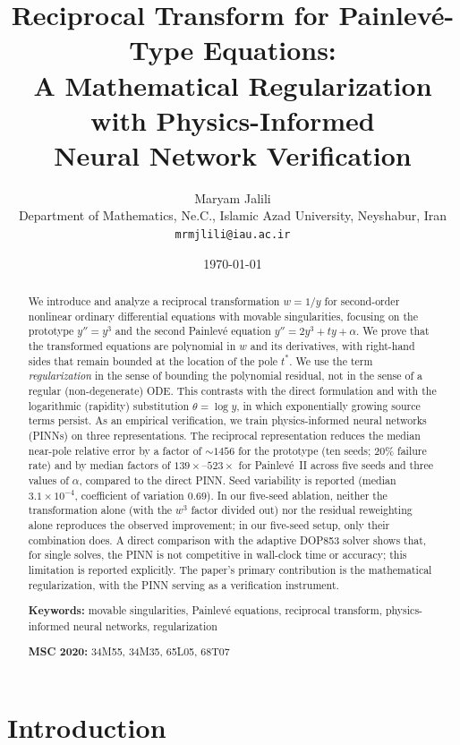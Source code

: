 \documentclass[11pt,a4paper]{article}
\title{Reciprocal Transform for Painlev\'e-Type Equations:\\
A Mathematical Regularization with Physics-Informed\\
Neural Network Verification}
\author{Maryam Jalili\\
Department of Mathematics, Ne.C., Islamic Azad University, Neyshabur, Iran\\
\texttt{mrmjlili@iau.ac.ir}}
\date{\today}
\theoremstyle{definition}
\begin{document}
\maketitle

\begin{abstract}
We introduce and analyze a reciprocal transformation $w = 1/y$
for second-order nonlinear ordinary differential equations with
movable singularities, focusing on the prototype $y'' = y^3$ and the
second Painlev\'e equation $y'' = 2y^3 + ty + \alpha$.
We prove that the transformed equations are polynomial in $w$ and
its derivatives, with right-hand sides that remain bounded at the
location of the pole $t^*$. We use the term \emph{regularization} in the sense of bounding the polynomial residual, not in the sense of a regular (non-degenerate) ODE. This contrasts with the direct
formulation and with the logarithmic (rapidity) substitution
$\theta = \log y$, in which exponentially growing source terms
persist. As an empirical verification, we train physics-informed
neural networks (PINNs) on three representations. The reciprocal
representation reduces the median near-pole relative error by a factor of
$\sim1456$ for the prototype (ten seeds; 20\% failure rate) and by median factors of $139\times$--$523\times$ for Painlev\'e~II across five seeds and three values of $\alpha$, compared to the direct PINN.
Seed variability is reported
(median $3.1\times 10^{-4}$, coefficient of variation $0.69$).
In our five-seed ablation, neither the transformation alone (with the $w^3$ factor divided out) nor the residual reweighting alone reproduces the observed improvement; in our five-seed setup, only their combination does. A direct comparison with the adaptive
DOP853 solver shows that, for single solves, the PINN is not
competitive in wall-clock time or accuracy; this limitation is
reported explicitly. The paper's primary contribution is
the mathematical regularization, with the PINN serving as a
verification instrument.

\medskip
\noindent\textbf{Keywords:}
movable singularities, Painlev\'e equations, reciprocal transform,
physics-informed neural networks, regularization

\medskip
\noindent\textbf{MSC 2020:} 34M55, 34M35, 65L05, 68T07
\end{abstract}

\section{Introduction}
\label{sec:intro}
\end{document}
